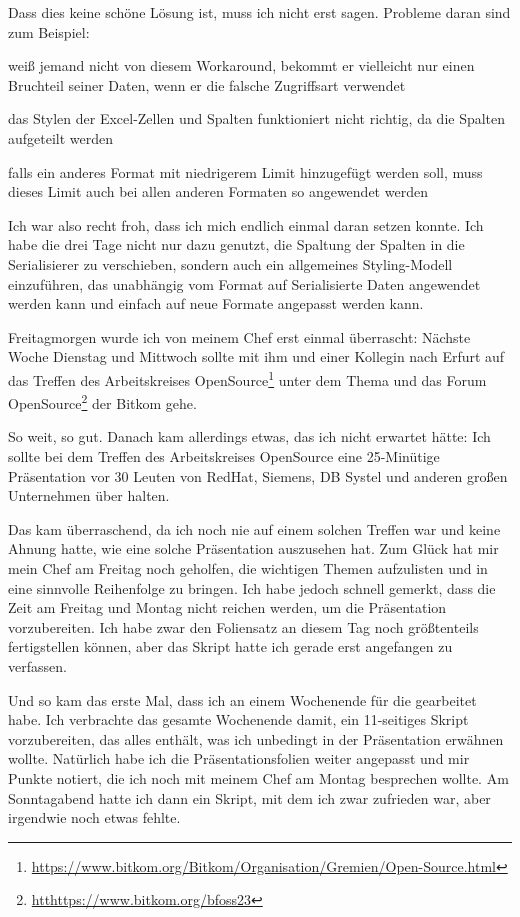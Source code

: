 Dass dies keine schöne Lösung ist, muss ich nicht erst sagen.
Probleme daran sind zum Beispiel:

\begin{smitemize}
    \item weiß jemand nicht von diesem Workaround, bekommt er vielleicht nur einen Bruchteil seiner Daten, wenn er die falsche Zugriffsart verwendet
    \item das Stylen der Excel-Zellen und Spalten funktioniert nicht richtig, da die Spalten aufgeteilt werden
    \item falls ein anderes Format mit niedrigerem Limit hinzugefügt werden soll, muss dieses Limit auch bei allen anderen Formaten so angewendet werden
\end{smitemize}

Ich war also recht froh, dass ich mich endlich einmal daran setzen konnte.
Ich habe die drei Tage nicht nur dazu genutzt, die Spaltung der Spalten in die Serialisierer zu verschieben, sondern auch ein allgemeines Styling-Modell einzuführen, das unabhängig vom Format auf Serialisierte Daten angewendet werden kann und einfach auf neue Formate angepasst werden kann.


Freitagmorgen wurde ich von meinem Chef erst einmal überrascht:
Nächste Woche Dienstag und Mittwoch sollte mit ihm und einer Kollegin nach Erfurt auf das Treffen des Arbeitskreises OpenSource\footnote{\url{https://www.bitkom.org/Bitkom/Organisation/Gremien/Open-Source.html}} unter dem Thema  und das Forum OpenSource\footnote{\url{htthttps://www.bitkom.org/bfoss23}} der Bitkom gehe.

So weit, so gut.
Danach kam allerdings etwas, das ich nicht erwartet hätte: Ich sollte bei dem Treffen des Arbeitskreises OpenSource eine 25-Minütige Präsentation vor 30 Leuten von RedHat, Siemens, DB Systel und anderen großen Unternehmen über  halten.

Das kam überraschend, da ich noch nie auf einem solchen Treffen war und keine Ahnung hatte, wie eine solche Präsentation auszusehen hat.
Zum Glück hat mir mein Chef am Freitag noch geholfen, die wichtigen Themen aufzulisten und in eine sinnvolle Reihenfolge zu bringen.
Ich habe jedoch schnell gemerkt, dass die Zeit am Freitag und Montag nicht reichen werden, um die Präsentation vorzubereiten.
Ich habe zwar den Foliensatz an diesem Tag noch größtenteils fertigstellen können, aber das Skript hatte ich gerade erst angefangen zu verfassen.


Und so kam das erste Mal, dass ich an einem Wochenende für die {\metaeffekt} gearbeitet habe.
Ich verbrachte das gesamte Wochenende damit, ein 11-seitiges Skript vorzubereiten, das alles enthält, was ich unbedingt in der Präsentation erwähnen wollte.
Natürlich habe ich die Präsentationsfolien weiter angepasst und mir Punkte notiert, die ich noch mit meinem Chef am Montag besprechen wollte.
Am Sonntagabend hatte ich dann ein Skript, mit dem ich zwar zufrieden war, aber irgendwie noch etwas fehlte.

